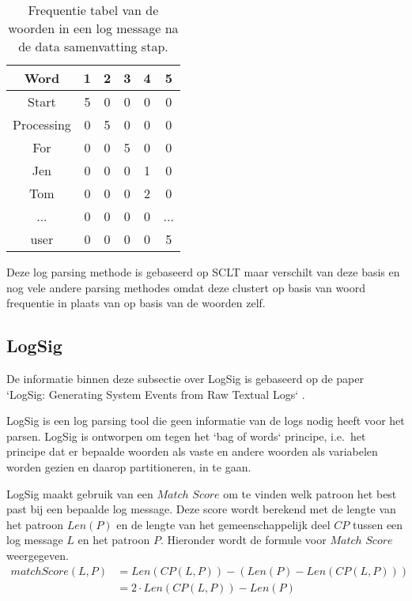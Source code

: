 \begin{table}
    \caption{Frequentie tabel van de woorden in een log message na de data samenvatting stap.}
    \label{table:frequentietabel}
    \begin{center}
        \begin{tabular}{||c c c c c c||} 
            \hline
            Word & 1 & 2 & 3 & 4 & 5 \\
            \hline\hline
            Start & 5 & 0 & 0 & 0 & 0 \\ 
            \hline
            Processing & 0 & 5 & 0 & 0 & 0 \\
            \hline
            For & 0 & 0 & 5 & 0 & 0 \\
            \hline
            Jen & 0 & 0 & 0 & 1 & 0 \\
            \hline
            Tom & 0 & 0 & 0 & 2 & 0 \\
            \hline
            ... & 0 & 0 & 0 & 0 & ... \\
            \hline
            user & 0 & 0 & 0 & 0 & 5 \\
            \hline
        \end{tabular}
    \end{center}
\end{table}

Deze log parsing methode is gebaseerd op SCLT maar verschilt van deze basis en nog vele andere parsing methodes omdat deze clustert op basis van woord frequentie in plaats van op basis van de woorden zelf.

\subsection{LogSig}
De informatie binnen deze subsectie over LogSig is gebaseerd op de paper `LogSig: Generating System Events from Raw Textual Logs` \autocite{tang2011logsig}.

LogSig is een log parsing tool die geen informatie van de logs nodig heeft voor het parsen. LogSig is ontworpen om tegen het `bag of words` principe, i.e.\ het principe dat er bepaalde woorden als vaste en andere woorden als variabelen worden gezien en daarop partitioneren, in te gaan. 

LogSig maakt gebruik van een $Match$ $Score$ om te vinden welk patroon het best past bij een bepaalde log message. Deze score wordt berekend met de lengte van het patroon $Len(P)$ en de lengte van het gemeenschappelijk deel $CP$ tussen een log message $L$ en het patroon $P$. Hieronder wordt de formule voor $Match$ $Score$ weergegeven.
\begin{equation} \label{eq2}
    \begin{split}
        matchScore(L, P) & = Len(CP(L,P)) - (Len(P) - Len(CP(L,P))) \\
        & = 2 \cdot Len(CP(L,P)) - Len(P)
    \end{split}
\end{equation}


